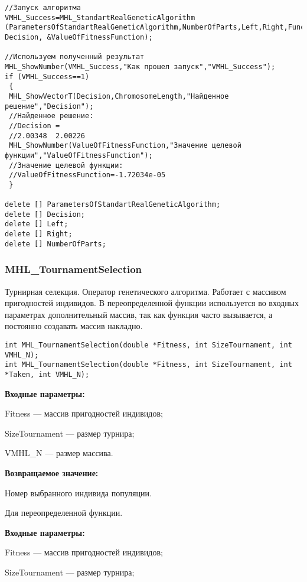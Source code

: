 \documentclass[a4paper,12pt]{article}
\begin{document}
\begin{lstlisting}[label=code_use_MHL_StandartRealGeneticAlgorithm,caption=Пример использования]
//Запуск алгоритма
VMHL_Success=MHL_StandartRealGeneticAlgorithm (ParametersOfStandartRealGeneticAlgorithm,NumberOfParts,Left,Right,Func2, Decision, &ValueOfFitnessFunction);

//Используем полученный результат
MHL_ShowNumber(VMHL_Success,"Как прошел запуск","VMHL_Success");
if (VMHL_Success==1)
 {
 MHL_ShowVectorT(Decision,ChromosomeLength,"Найденное решение","Decision");
 //Найденное решение:
 //Decision =	
 //2.00348	2.00226
 MHL_ShowNumber(ValueOfFitnessFunction,"Значение целевой функции","ValueOfFitnessFunction");
 //Значение целевой функции:
 //ValueOfFitnessFunction=-1.72034e-05
 }

delete [] ParametersOfStandartRealGeneticAlgorithm;
delete [] Decision;
delete [] Left;
delete [] Right;
delete [] NumberOfParts;
\end{lstlisting}

\subsubsection{MHL\_TournamentSelection}\label{MHL_TournamentSelection}

Турнирная селекция. Оператор генетического алгоритма. Работает с массивом пригодностей индивидов. В переопределенной функции используется во входных параметрах дополнительный массив, так как функция часто вызывается, а постоянно создавать массив накладно.


\begin{lstlisting}[label=code_syntax_MHL_TournamentSelection,caption=Синтаксис]
int MHL_TournamentSelection(double *Fitness, int SizeTournament, int VMHL_N);
int MHL_TournamentSelection(double *Fitness, int SizeTournament, int *Taken, int VMHL_N);
\end{lstlisting}

\textbf{Входные параметры:}
 
 Fitness --- массив пригодностей индивидов;
 
 SizeTournament --- размер турнира;
 
 VMHL\_N --- размер массива.

\textbf{Возвращаемое значение:} 

 Номер выбранного индивида популяции.

 Для переопределенной функции.
 
 \textbf{Входные параметры:}
 
 Fitness --- массив пригодностей индивидов;
 
 SizeTournament --- размер турнира;
 
\end{document}
